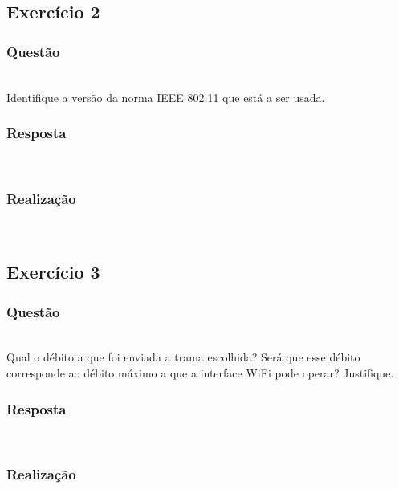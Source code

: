 \documentclass{llncs}
\begin{document}
\clearpage
\subsection{Exercício 2}
\subsubsection{Questão}\rule[-10pt]{0pt}{10pt}\\

Identifique a versão da norma IEEE 802.11 que está a ser usada.

\subsubsection{Resposta}\rule[-10pt]{0pt}{10pt}\\



\subsubsection{Realização}\rule[-10pt]{0pt}{10pt}\\



\clearpage
\subsection{Exercício 3}
\subsubsection{Questão}\rule[-10pt]{0pt}{10pt}\\

Qual o débito a que foi enviada a trama escolhida? Será que esse débito corresponde ao débito máximo a que a interface WiFi pode operar? Justifique.

\subsubsection{Resposta}\rule[-10pt]{0pt}{10pt}\\



\subsubsection{Realização}\rule[-10pt]{0pt}{10pt}\\
\end{document}
